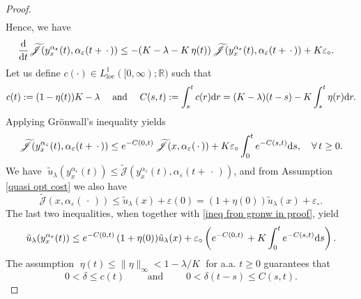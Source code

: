 \documentclass[12pt]{amsart}
\newcommand{\D}[1]{\mbox{\rm #1}}
\newcommand{\dd}{\D{d}}
\numberwithin{equation}{section}
\theoremstyle{plain}
\begin{document}
\begin{proof}
\begin{equation}
\begin{aligned}
\end{aligned}
\end{equation}
Hence, we have
\begin{equation}\label{eq: ineq J in proof 2}
\begin{aligned}
    \frac{\dd }{\dd t} \widetilde{\mathscr{J}}(y_{x}^{\alpha_{\varepsilon}}(t),\alpha_{\varepsilon}(t+\,\cdot\,))
    & \leq -(K-\lambda - K\,\eta(t)) \,\widetilde{\mathscr{J}}(y_{x}^{\alpha_{\varepsilon}}(t),\alpha_{\varepsilon}(t+\,\cdot\,)) + K\varepsilon_{\circ}.
\end{aligned}
\end{equation}
Let us define $c(\cdot)\in L^{1}_{\text{loc}}([0,\infty);\mathbb{R})$ such that 
\begin{equation*}
    c(t):=(1-\eta(t))K-\lambda \quad \text{ and } \quad C(s,t) := \int_{s}^{t}c(r)\dd r = (K-\lambda)(t-s) - K\int_{s}^{t}\eta(r)\dd r.
\end{equation*}
Applying Gr\"onwall's inequality yields
\begin{equation}\label{ineq fron gronw in proof}
    \widetilde{\mathscr{J}}(y_{x}^{\alpha_{\varepsilon}}(t),\alpha_{\varepsilon}(t+\,\cdot\,)) \leq e^{-C(0,t)}\,\widetilde{\mathscr{J}}(x,\alpha_{\varepsilon}(\,\cdot\,)) + K\varepsilon_{\circ} \int_{0}^{t}e^{-C(s,t)}\dd s, \quad \forall\,t\geq0.
\end{equation}
We have $\;\tilde{u}_{\lambda}(y_{x}^{\alpha_{\varepsilon}}(t)) \leq \widetilde{\mathscr{J}}(y_{x}^{\alpha_{\varepsilon}}(t),\alpha_{\varepsilon}(t+\,\cdot\,))$,\; and from Assumption \ref{quasi opt cost} we also have 
\begin{equation*}
    \widetilde{\mathscr{J}}(x,\alpha_{\varepsilon}(\,\cdot\,)) \leq \tilde{u}_{\lambda}(x) + \varepsilon(0) = (1+\eta(0))\tilde{u}_{\lambda}(x) + \varepsilon_{\circ}.
\end{equation*}
The last two inequalities, when together with \eqref{ineq fron gronw in proof}, yield
\begin{equation}\label{ineq quasi opt value in proof}
    \tilde{u}_{\lambda}(y_{x}^{\alpha_{\varepsilon}}(t)) \leq e^{-C(0,t)}\,(1+\eta(0))\tilde{u}_{\lambda}(x) + \varepsilon_{\circ} \left(e^{-C(0,t)}\,+K\int_{0}^{t}e^{-C(s,t)}\dd s\right).
\end{equation}
The assumption $\;\eta(t)\leq \|\eta\|_{\infty}< 1- \lambda/K\;$ for a.a. $t\geq 0$ guarantees that 
\begin{equation*}
    0< \delta \leq c(t) \quad\quad \text{ and } \quad\quad 0< \delta(t-s) \leq C(s,t).
\end{equation*}

\end{proof}
\end{document}
